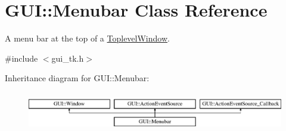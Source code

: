 \hypertarget{classGUI_1_1Menubar}{\section{G\-U\-I\-:\-:Menubar Class Reference}
\label{classGUI_1_1Menubar}
}


A menu bar at the top of a \hyperlink{classGUI_1_1ToplevelWindow}{Toplevel\-Window}.  




{\ttfamily \#include $<$gui\-\_\-tk.\-h$>$}

Inheritance diagram for G\-U\-I\-:\-:Menubar\-:\begin{figure}[H]
\begin{center}
\leavevmode
\includegraphics[height=1.769352cm]{classGUI_1_1Menubar}
\end{center}
\end{figure}

